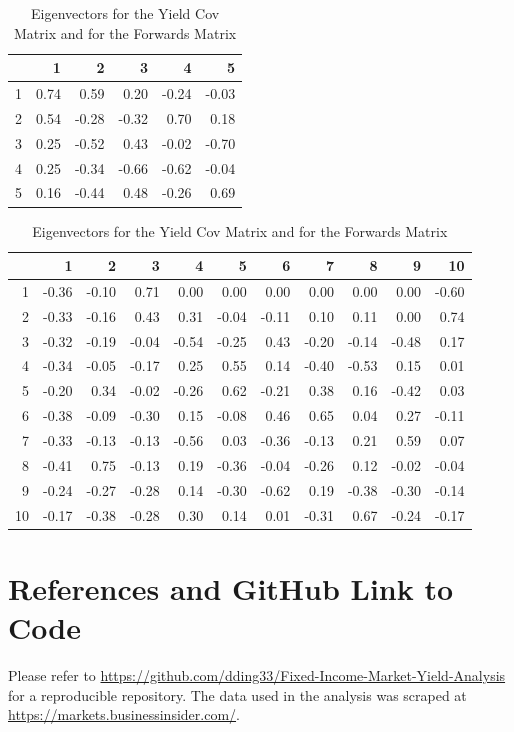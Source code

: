 \documentclass{article}
\begin{document}
\begin{enumerate}
\begin{table}[ht]
\centering
\begin{tabular}{rrrrrr}
  \hline
 & 1 & 2 & 3 & 4 & 5 \\ 
  \hline
1 & 0.74 & 0.59 & 0.20 & -0.24 & -0.03 \\ 
  2 & 0.54 & -0.28 & -0.32 & 0.70 & 0.18 \\ 
  3 & 0.25 & -0.52 & 0.43 & -0.02 & -0.70 \\ 
  4 & 0.25 & -0.34 & -0.66 & -0.62 & -0.04 \\ 
  5 & 0.16 & -0.44 & 0.48 & -0.26 & 0.69 \\ 
   \hline
\end{tabular}
\centering
\begin{tabular}{rrrrrrrrrrr}
  \hline
 & 1 & 2 & 3 & 4 & 5 & 6 & 7 & 8 & 9 & 10 \\ 
  \hline
1 & -0.36 & -0.10 & 0.71 & 0.00 & 0.00 & 0.00 & 0.00 & 0.00 & 0.00 & -0.60 \\ 
  2 & -0.33 & -0.16 & 0.43 & 0.31 & -0.04 & -0.11 & 0.10 & 0.11 & 0.00 & 0.74 \\ 
  3 & -0.32 & -0.19 & -0.04 & -0.54 & -0.25 & 0.43 & -0.20 & -0.14 & -0.48 & 0.17 \\ 
  4 & -0.34 & -0.05 & -0.17 & 0.25 & 0.55 & 0.14 & -0.40 & -0.53 & 0.15 & 0.01 \\ 
  5 & -0.20 & 0.34 & -0.02 & -0.26 & 0.62 & -0.21 & 0.38 & 0.16 & -0.42 & 0.03 \\ 
  6 & -0.38 & -0.09 & -0.30 & 0.15 & -0.08 & 0.46 & 0.65 & 0.04 & 0.27 & -0.11 \\ 
  7 & -0.33 & -0.13 & -0.13 & -0.56 & 0.03 & -0.36 & -0.13 & 0.21 & 0.59 & 0.07 \\ 
  8 & -0.41 & 0.75 & -0.13 & 0.19 & -0.36 & -0.04 & -0.26 & 0.12 & -0.02 & -0.04 \\ 
  9 & -0.24 & -0.27 & -0.28 & 0.14 & -0.30 & -0.62 & 0.19 & -0.38 & -0.30 & -0.14 \\ 
  10 & -0.17 & -0.38 & -0.28 & 0.30 & 0.14 & 0.01 & -0.31 & 0.67 & -0.24 & -0.17 \\ 
   \hline
\end{tabular}
\caption{Eigenvectors for the Yield Cov Matrix and for the Forwards Matrix}
\label{Eigens}
\end{table}

\end{enumerate}

\section*{References and GitHub Link to Code}
    Please refer to \url{https://github.com/dding33/Fixed-Income-Market-Yield-Analysis} for a reproducible repository. The data used in the analysis was scraped at \url{https://markets.businessinsider.com/}.
\end{document}
